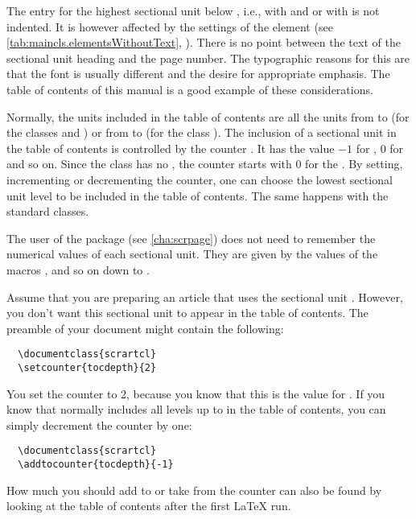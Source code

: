 \begin{Explain}
The entry for the highest sectional unit below , i.e.,
 with  and
 or  with
 is not indented. It is however
affected by the settings of the element
 (see
\autoref{tab:maincls.elementsWithoutText},
). There is no point
between the text of the sectional unit heading and the page number. The
typographic reasons for this are that the font is usually different
and the desire for appropriate emphasis. The table of contents of this
manual is a good example of these considerations.%
\end{Explain}

\begin{Declaration}
\end{Declaration}%
%
Normally, the units included in the table of contents are all the
units from  to  (for the classes
 and ) or from  to
 (for the class ).  The inclusion
of a sectional unit in the table of contents is controlled by the
counter . It has the value \(-1\) for ,
\(0\) for  and so on. Since the class  has
no , the counter starts with 0 for the . By
setting, incrementing or decrementing the counter, one can choose the
lowest sectional unit level to be included in the table of contents.
The same happens with the standard classes.

The user of the  package (see
\autoref{cha:scrpage}) does not need to remember the numerical
values of each sectional unit. They are given by the values of the
macros ,  and so on down to
.
\begin{Example}
  Assume that you are preparing an article that uses the sectional
  unit . However, you don't want this sectional
  unit to appear in the table of contents. The preamble of your
  document might contain the following:
\begin{lstlisting}
  \documentclass{scrartcl}
  \setcounter{tocdepth}{2}
\end{lstlisting}
You set the counter  to 2, because you know that
this is the value for . If you know that
 normally includes all levels up to
 in the table of contents, you can simply
decrement the counter  by one:
\begin{lstlisting}
  \documentclass{scrartcl}
  \addtocounter{tocdepth}{-1}
\end{lstlisting}
How much you should add to or take from the  counter
can also be found by looking at the table of contents after the first
\LaTeX{} run.
\end{Example}
%
%

